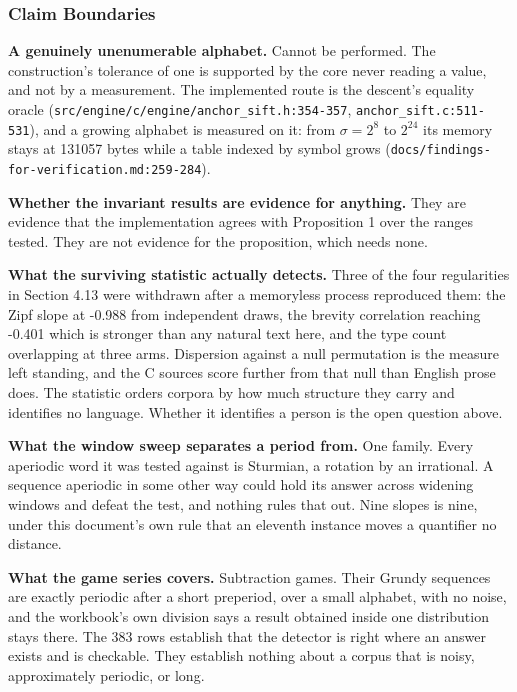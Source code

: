\subsubsection{Claim Boundaries}

\textbf{A genuinely unenumerable alphabet.} Cannot be performed. The construction's tolerance of one is supported by the core never reading a value, and not by a measurement. The implemented route is the descent's equality oracle (\texttt{src/\allowbreak{}engine/\allowbreak{}c/\allowbreak{}engine/\allowbreak{}anchor\_sift.h:354-357}, \texttt{anchor\_sift.c:511-531}), and a growing alphabet is measured on it: from \(\sigma = 2^8\) to \(2^{24}\) its memory stays at 131057 bytes while a table indexed by symbol grows (\texttt{docs/\allowbreak{}findings-\allowbreak{}for-\allowbreak{}verification.md:259-284}).

\textbf{Whether the invariant results are evidence for anything.} They are evidence that the implementation agrees with Proposition 1 over the ranges tested. They are not evidence for the proposition, which needs none.

\textbf{What the surviving statistic actually detects.} Three of the four regularities in Section 4.13 were withdrawn after a memoryless process reproduced them: the Zipf slope at -0.988 from independent draws, the brevity correlation reaching -0.401 which is stronger than any natural text here, and the type count overlapping at three arms. Dispersion against a null permutation is the measure left standing, and the C sources score further from that null than English prose does. The statistic orders corpora by how much structure they carry and identifies no language. Whether it identifies a person is the open question above.

\textbf{What the window sweep separates a period from.} One family. Every aperiodic word it was tested against is Sturmian, a rotation by an irrational. A sequence aperiodic in some other way could hold its answer across widening windows and defeat the test, and nothing rules that out. Nine slopes is nine, under this document's own rule that an eleventh instance moves a quantifier no distance.

\textbf{What the game series covers.} Subtraction games. Their Grundy sequences are exactly periodic after a short preperiod, over a small alphabet, with no noise, and the workbook's own division says a result obtained inside one distribution stays there. The 383 rows establish that the detector is right where an answer exists and is checkable. They establish nothing about a corpus that is noisy, approximately periodic, or long.

